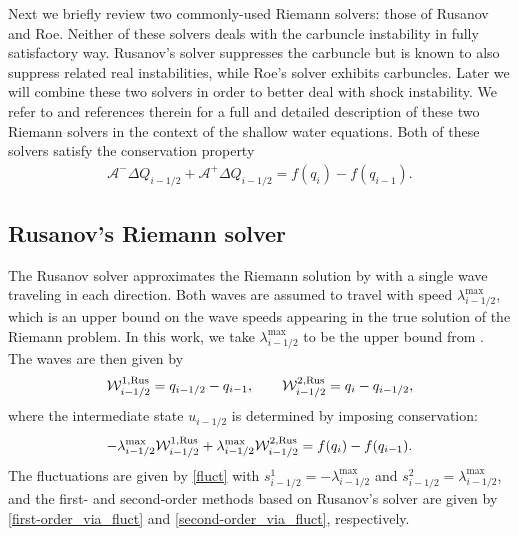\documentclass[preprint, 11pt]{article}
\newcommand{\W}{{\mathcal W}}
\newcommand{\A}{{\mathcal A}}
\newcommand{\apdq}{\A^+ \!\!{\Delta} Q}
\newcommand{\amdq}{\A^- \!\!{\Delta} Q}
\newcommand{\imh}{{i-1/2}}
\newcommand{\bff}{{f}}
\newcommand{\bfu}{{u}}
\newcommand{\bfq}{{q}}
\newcommand{\Rus}{{\rm Rus}}
\begin{document}
Next we briefly review two commonly-used Riemann solvers: those of Rusanov and
Roe.  Neither of these solvers deals with the carbuncle instability in fully
satisfactory way.  Rusanov's solver suppresses the carbuncle but is known to
also suppress related real instabilities, while Roe's solver exhibits carbuncles.
Later we will combine these two solvers in order to better deal with shock instability.
We refer to \cite{ketcheson2020riemann} and references therein for
a full and detailed description of these two Riemann solvers in the context of
the shallow water equations.  Both of these solvers satisfy the conservation
property
\begin{align} \label{rs_conservation}
    \amdq_\imh + \apdq_\imh = \bff(\bfq_i) - \bff(\bfq_{i-1}).
\end{align}


\subsection{Rusanov's Riemann solver}\label{sec:rusanov}
The Rusanov solver approximates the Riemann solution by with a single wave traveling in each
direction.  Both waves are assumed to travel with speed $\lambda^{\max}_\imh$, which is an
upper bound on the wave speeds appearing in the true solution of the Riemann problem.
In this work, we take $\lambda_{i-1/2}^{\max}$ to be the upper bound
from \cite[Prop. 3.7]{azerad2017well}.
The waves are then given by
\begin{align}\label{rusanov_waves}
  \W_{i-1/2}^{1,\Rus}=\bfq_{i-1/2}-\bfq_{i-1}, \qquad
  \W_{i-1/2}^{2,\Rus}=\bfq_{i}-\bfq_{i-1/2},
\end{align}
where the intermediate state $\bfu_{i-1/2}$ is determined by imposing conservation:
\begin{align}\label{rus_cons}
  -\lambda_{i-1/2}^{\max}\W_{i-1/2}^{1,\Rus}+\lambda_{i-1/2}^{\max}\W_{i-1/2}^{2,\Rus} = \bff(\bfq_{i})-\bff(\bfq_{i-1}).
\end{align}
The fluctuations are given by \eqref{fluct} with $s_{i-1/2}^1=-\lambda_{i-1/2}^{\max}$
and $s_{i-1/2}^2=\lambda_{i-1/2}^{\max}$, and the first- and second-order methods based
on Rusanov's solver are given by \eqref{first-order_via_fluct} and \eqref{second-order_via_fluct}, respectively.
\end{document}

